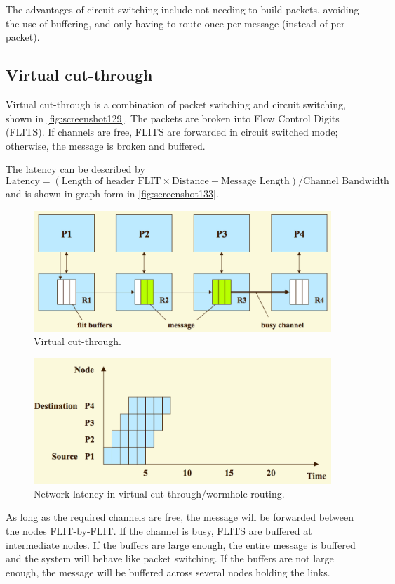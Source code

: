 The advantages of circuit switching include not needing to build packets, avoiding the use of buffering, and only having to route once per message (instead of per packet).

\subsection{Virtual cut-through}
Virtual cut-through is a combination of packet switching and circuit switching, shown in \autoref{fig:screenshot129}. The packets are broken into Flow Control Digits (FLITS). If channels are free, FLITS are forwarded in circuit switched mode; otherwise, the message is broken and buffered.

The latency can be described by
\[ \text{Latency} =  (\text{Length of header FLIT} \times \text{Distance} + \text{Message Length})/\text{Channel Bandwidth} \]
and is shown in graph form in \autoref{fig:screenshot133}.

\begin{figure}
\centering
\includegraphics[width=0.7\linewidth]{figures/screenshot129}
\caption{Virtual cut-through.}
\label{fig:screenshot129}
\end{figure}

\begin{figure}
\centering
\includegraphics[width=0.7\linewidth]{figures/screenshot133}
\caption{Network latency in virtual cut-through/wormhole routing.}
\label{fig:screenshot133}
\end{figure}


As long as the required channels are free, the message will be forwarded between the nodes FLIT-by-FLIT. If the channel is busy, FLITS are buffered at intermediate nodes. If the buffers are large enough, the entire message is buffered and the system will behave like packet switching. If the buffers are not large enough, the message will be buffered across several nodes holding the links.

